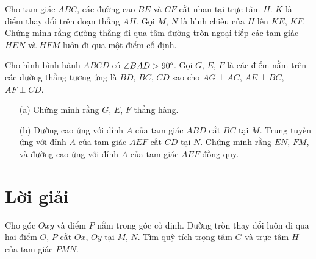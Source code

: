         \boom

        \begin{exercise}
            Cho tam giác \(ABC\), các đường cao \(BE\) và \(CF\) cắt nhau tại trực tâm \(H\). \(K\) là điểm thay đổi trên đoạn thẳng \(AH\). Gọi \(M\), \(N\) là hình chiếu của \(H\) lên \(KE\), \(KF\). Chứng minh rằng đường thẳng đi qua tâm đường tròn ngoại tiếp các tam giác \(HEN\) và \(HFM\) luôn đi qua một điểm cố định.
        \end{exercise}

        \boom

        \begin{exercise}
            Cho hình bình hành \(ABCD\) có \(\angle BAD > 90 \degree\). Gọi \(G\), \(E\), \(F\) là các điểm nằm trên các đường thẳng tương ứng là \(BD\), \(BC\), \(CD\) sao cho \(AG \perp AC\), \(AE \perp BC\), \(AF \perp CD\).
            \begin{enumerate}
                \item[(a)] Chứng minh rằng \(G\), \(E\), \(F\) thẳng hàng.
                \item[(b)] Đường cao ứng với đỉnh \(A\) của tam giác \(ABD\) cắt \(BC\) tại \(M\). Trung tuyến ứng với đỉnh \(A\) của tam giác \(AEF\) cắt \(CD\) tại \(N\). Chứng minh rằng \(EN\), \(FM\), và đường cao ứng với đỉnh \(A\) của tam giác \(AEF\) đồng quy.
            \end{enumerate}
        \end{exercise}

    \newpage

    \section{Lời giải}

        \begin{problem}
            Cho góc \(Oxy\) và điểm \(P\) nằm trong góc cố định. Đường tròn thay đổi luôn đi qua hai điểm \(O\), \(P\) cắt \(Ox\), \(Oy\) tại \(M\), \(N\). Tìm quỹ tích trọng tâm \(G\) và trực tâm \(H\) của tam giác \(PMN\).
        \end{problem}

